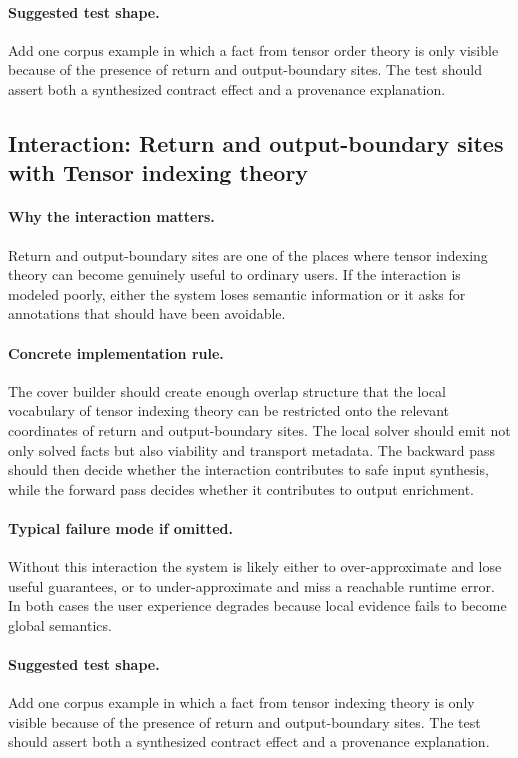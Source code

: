 \documentclass[11pt]{report}
\theoremstyle{definition}
\theoremstyle{plain}
\begin{document}
\paragraph{Suggested test shape.}
Add one corpus example in which a fact from tensor order theory is only
visible because of the presence of return and output-boundary sites. The test should
assert both a synthesized contract effect and a provenance explanation.

\subsection{Interaction: Return and output-boundary sites with Tensor indexing theory}

\paragraph{Why the interaction matters.}
Return and output-boundary sites are one of the places where tensor indexing theory can become
genuinely useful to ordinary users. If the interaction is modeled poorly,
either the system loses semantic information or it asks for annotations that
should have been avoidable.

\paragraph{Concrete implementation rule.}
The cover builder should create enough overlap structure that the local
vocabulary of tensor indexing theory can be restricted onto the relevant
coordinates of return and output-boundary sites. The local solver should emit not only
solved facts but also viability and transport metadata. The backward pass
should then decide whether the interaction contributes to safe input
synthesis, while the forward pass decides whether it contributes to output
enrichment.

\paragraph{Typical failure mode if omitted.}
Without this interaction the system is likely either to over-approximate and
lose useful guarantees, or to under-approximate and miss a reachable runtime
error. In both cases the user experience degrades because local evidence
fails to become global semantics.

\paragraph{Suggested test shape.}
Add one corpus example in which a fact from tensor indexing theory is only
visible because of the presence of return and output-boundary sites. The test should
assert both a synthesized contract effect and a provenance explanation.
\end{document}

